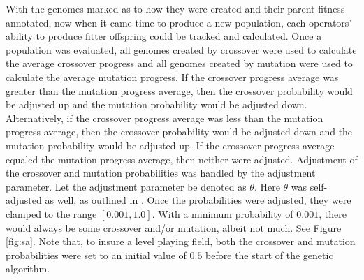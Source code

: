 With the genomes marked as to how they were created and their parent fitness annotated, now when it came time to produce a new population, each operators' ability to produce fitter offspring could be tracked and calculated. Once a population was evaluated, all genomes created by crossover were used to calculate the average crossover progress and all genomes created by mutation were used to calculate the average mutation progress. If the crossover progress average was greater than the mutation progress average, then the crossover probability would be adjusted up and the mutation probability would be adjusted down. Alternatively, if the crossover progress average was less than the mutation progress average, then the crossover probability would be adjusted down and the mutation probability would be adjusted up. If the crossover progress average equaled the mutation progress average, then neither were adjusted. Adjustment of the crossover and mutation probabilities was handled by the adjustment parameter. Let the adjustment parameter be denoted as $\theta$. Here $\theta$ was self-adjusted as well, as outlined in \cite{self_adapt}. Once the probabilities were adjusted, they were clamped to the range $[0.001,1.0]$. With a minimum probability of $0.001$, there would always be some crossover and/or mutation, albeit not much. See Figure \ref{fig:sa}. Note that, to insure a level playing field, both the crossover and mutation probabilities were set to an initial value of $0.5$ before the start of the genetic algorithm.


\renewcommand{\baselinestretch}{1.0}

